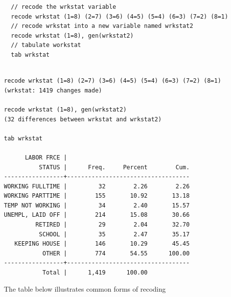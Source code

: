 \documentclass[]{book}
\begin{document}
\begin{verbatim}
  // recode the wrkstat variable 
  recode wrkstat (1=8) (2=7) (3=6) (4=5) (5=4) (6=3) (7=2) (8=1)
  // recode wrkstat into a new variable named wrkstat2
  recode wrkstat (1=8), gen(wrkstat2)
  // tabulate workstat
  tab wrkstat
\end{verbatim}

\begin{verbatim}

recode wrkstat (1=8) (2=7) (3=6) (4=5) (5=4) (6=3) (7=2) (8=1)
(wrkstat: 1419 changes made)

recode wrkstat (1=8), gen(wrkstat2)
(32 differences between wrkstat and wrkstat2)

tab wrkstat

      LABOR FRCE |
          STATUS |      Freq.     Percent        Cum.
-----------------+-----------------------------------
WORKING FULLTIME |         32        2.26        2.26
WORKING PARTTIME |        155       10.92       13.18
TEMP NOT WORKING |         34        2.40       15.57
UNEMPL, LAID OFF |        214       15.08       30.66
         RETIRED |         29        2.04       32.70
          SCHOOL |         35        2.47       35.17
   KEEPING HOUSE |        146       10.29       45.45
           OTHER |        774       54.55      100.00
-----------------+-----------------------------------
           Total |      1,419      100.00
\end{verbatim}

The table below illustrates common forms of recoding
\end{document}
